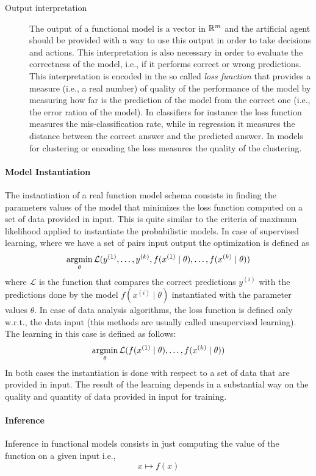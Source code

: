 \begin{description}
\item[Output interpretation]
  The output of a functional model is a vector in $\mathbb{R}^m$ and the
  artificial agent should be provided with a way to use this output in
  order to take decisions and actions. This interpretation is also
  necessary in order to evaluate the correctness of the model, i.e.,
  if it performs correct or wrong predictions. This interpretation is
  encoded in the so called \emph{loss function} that provides a measure
  (i.e., a real number) of quality of the performance of the model by
  measuring how far is the prediction of the model from the correct
  one (i.e., the error ration of the model). In classifiers for
  instance the loss function measures the mis-classification rate,
  while in regression it measures the distance between the correct
  answer and the predicted answer. In models for clustering or
  encoding the loss measures the quality of the clustering. 
\end{description}

\paragraph{Model Instantiation}
The instantiation of a real function model schema consists in
finding the parameters values of the model that minimizes the loss
function computed on a set of data provided in input. This is quite
similar to the criteria of maximum likelihood applied to instantiate
the probabilistic models. In case of supervised learning, where we
have a set of pairs input output the optimization is defined as
$$
\operatorname*{argmin}_{\theta}\mathcal{L}(y^{(1)},\dots,y^{(k)}, f(x^{(1)}\mid\theta),\dots,f(x^{(k)}\mid\theta))
$$
where $\mathcal{L}$ is the function that compares the correct
predictions $y^{(i)}$ with the predictions done by the model
$f(x^{(i)}\mid\theta)$ instantiated with the parameter values
$\theta$.
In case of data analysis algorithms, the loss function is defined only
w.r.t., the data input (this methods are usually called unsupervised
learning). The learning in this case is defined as follows: 
$$
\operatorname*{argmin}_{\theta}\mathcal{L}(f(x^{(1)}\mid\theta),\dots,f(x^{(k)}\mid\theta))
$$
In both cases the instantiation is done with respect to a set of data
that are provided in input. The result of the learning depends in a
substantial way on the quality and quantity of data provided in input
for training. 

\paragraph{Inference}
Inference in functional models consists in just computing the value of
the function on a given input i.e.,
$$
x \mapsto f(x)
$$
